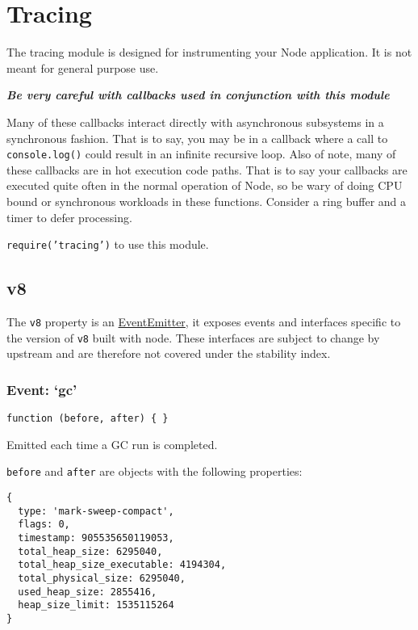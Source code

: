 \section{Tracing}\label{tracing}

\begin{Shaded}
\begin{Highlighting}[]
 
\end{Highlighting}
\end{Shaded}

The tracing module is designed for instrumenting your Node application.
It is not meant for general purpose use.

\textbf{\emph{Be very careful with callbacks used in conjunction with
this module}}

Many of these callbacks interact directly with asynchronous subsystems
in a synchronous fashion. That is to say, you may be in a callback where
a call to \texttt{console.log()} could result in an infinite recursive
loop. Also of note, many of these callbacks are in hot execution code
paths. That is to say your callbacks are executed quite often in the
normal operation of Node, so be wary of doing CPU bound or synchronous
workloads in these functions. Consider a ring buffer and a timer to
defer processing.

\texttt{require('tracing')} to use this module.

\subsection{v8}\label{v8}

The \texttt{v8} property is an
\href{events.html\#events_class_events_eventemitter}{EventEmitter}, it
exposes events and interfaces specific to the version of \texttt{v8}
built with node. These interfaces are subject to change by upstream and
are therefore not covered under the stability index.

\subsubsection{Event: `gc'}\label{event-gc}

\texttt{function (before, after) \{ \}}

Emitted each time a GC run is completed.

\texttt{before} and \texttt{after} are objects with the following
properties:

\begin{verbatim}
{
  type: 'mark-sweep-compact',
  flags: 0,
  timestamp: 905535650119053,
  total_heap_size: 6295040,
  total_heap_size_executable: 4194304,
  total_physical_size: 6295040,
  used_heap_size: 2855416,
  heap_size_limit: 1535115264
}
\end{verbatim}


